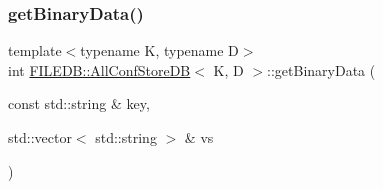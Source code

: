 \subsubsection{\texorpdfstring{getBinaryData()}{getBinaryData()}\hspace{0.1cm}{\footnotesize\ttfamily [3/3]}}
{\footnotesize\ttfamily template$<$typename K, typename D$>$ \\
int \mbox{\hyperlink{classFILEDB_1_1AllConfStoreDB}{F\+I\+L\+E\+D\+B\+::\+All\+Conf\+Store\+DB}}$<$ K, D $>$\+::get\+Binary\+Data (\begin{DoxyParamCaption}\item[{const std\+::string \&}]{key,  }\item[{std\+::vector$<$ std\+::string $>$ \&}]{vs }\end{DoxyParamCaption})\hspace{0.3cm}{\ttfamily [inline]}}

